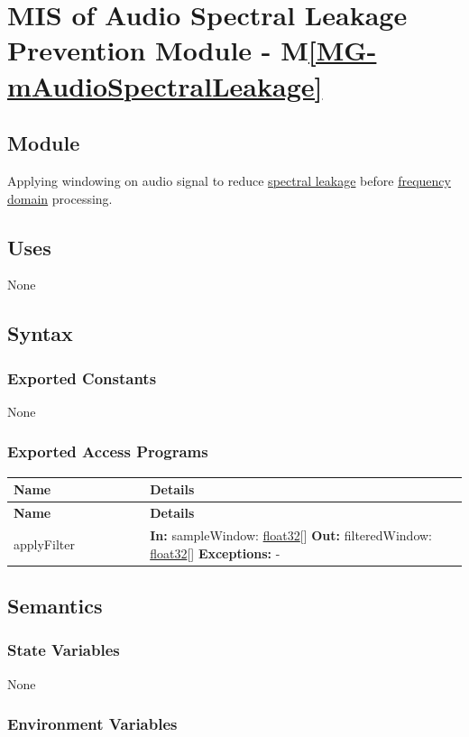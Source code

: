 \documentclass[12pt, titlepage]{article}
\newcommand{\mref}[1]{M\ref{#1}}
\newenvironment{apitable}{%
\begin{center}
\begin{longtable}{|p{0.3\linewidth}|p{0.7\linewidth}|} 
\hline
\textbf{Name} & \textbf{Details} \\
\hline
\endfirsthead
\hline
\textbf{Name} & \textbf{Details} \\
\hline
\endhead
\hline
\endfoot
\hline
\endlastfoot
}{%
\end{longtable}
\end{center}
}
\newcommand{\apifunc}[4]{%
#1 & 
\textbf{In:} #2 \newline
\textbf{Out:} #3 \newline
\textbf{Exceptions:} #4 \\
\hline
}
\begin{document}
\section{MIS of Audio Spectral Leakage Prevention Module
  \label{mod:AudioSpectralLeakage} - \mref{MG-mAudioSpectralLeakage}}

\subsection{Module}

Applying windowing on audio signal to reduce
\hyperref[SRS-def:spectral_leakage]{spectral leakage} before
\hyperref[SRS-def:frequency_domain]{frequency domain} processing.

\subsection{Uses}

None

\subsection{Syntax}

\subsubsection{Exported Constants}

None

\subsubsection{Exported Access Programs}
\begin{apitable}
  \apifunc{applyFilter}
    {sampleWindow: \hyperref[generic:float32]{float32}[]}
    {filteredWindow: \hyperref[generic:float32]{float32}[]}
    {-}
\end{apitable}

\subsection{Semantics}
\subsubsection{State Variables}

None

\subsubsection{Environment Variables}
\end{document}
